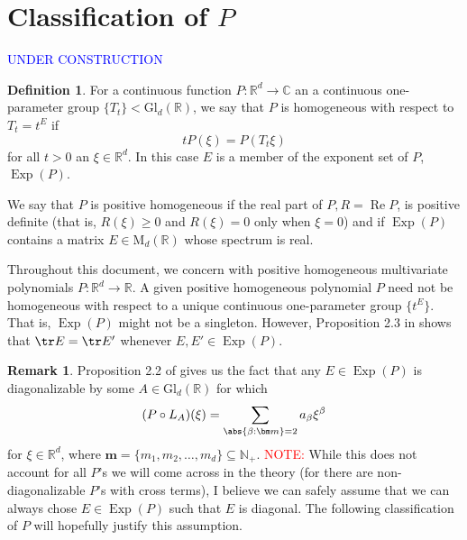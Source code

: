 \documentclass{article}
\theoremstyle{definition}
\renewcommand\Re{\operatorname{Re}}%
\newcommand\MdR{\mbox{M}_d(\mathbb{R})}
\newcommand\GldR{\mbox{Gl}_d(\mathbb{R})}
\newcommand\Exp{\operatorname{Exp}}
\newcommand*{\TakeFourierOrnament}[1]{{%
\fontencoding{U}\fontfamily{futs}\selectfont\char#1}}
\newcommand*{\danger}{\TakeFourierOrnament{66}}
\newcommand{\R}{\mathbb{R}}
\newcommand{\C}{\mathbb{C}}
\theoremstyle{theorem}
\newtheorem{definition}[theorem]{Definition}
\newtheorem{remark}{Remark}
\begin{document}
\newpage





\section{Classification of $P$}


\begin{framed}

\textcolor{blue}{\danger UNDER CONSTRUCTION \danger} 

\begin{definition}
For a continuous function $P: \R^d \to \C$ an a continuous one-parameter group $\{ T_t \} < \GldR{}$, we say that $P$ is homogeneous with respect to $T_t = t^E$ if 
\begin{equation*}
    tP(\xi) = P(T_t \xi)
\end{equation*}
for all $t>0$ an $\xi\in \R^d$. In this case $E$ is a member of the exponent set of $P$, $\Exp{(P)}$. 

We say that $P$ is positive homogeneous if the real part of $P, R =\Re{P}$, is positive definite (that is, $R(\xi) \geq 0$ and $R(\xi) = 0$ only when $\xi = 0$) and if $\Exp{(P)}$ contains a matrix $E\in \MdR{}$ whose spectrum is real. 
\end{definition}

Throughout this document, we concern with positive homogeneous multivariate polynomials $P : \R^d \to \R$. A given positive homogeneous polynomial $P$ need not be homogeneous with respect to a unique continuous one-parameter group $\{t^E\}$. That is, $\Exp(P)$ might not be a singleton. However, Proposition 2.3 in \cite{Randles2017} shows that $\tr E = \tr E'$ whenever $E,E'\in \Exp(P)$.



\begin{remark}
Proposition 2.2 of \cite{Randles2017} gives us the fact that any $E\in \Exp(P)$ is diagonalizable by some $A\in \GldR{}$ for which \begin{equation*}
    (P\circ L_A)(\xi) = \sum_{\abs{\beta : \bm m} = 2} a_\beta \xi^\beta
\end{equation*}
for $\xi\in \R^d$, where $\bm m = \{ m_1, m_2,\dots, m_d \}\subseteq \mathbb{N}_+$. \textcolor{red}{NOTE:} While this does not account for all $P$'s we will come across in the theory (for there are non-diagonalizable $P$'s with cross terms), I believe we can safely assume that we can always chose $E\in \Exp(P)$ such that $E$ is diagonal. The following classification of $P$ will hopefully justify this assumption.
\end{remark}




\end{framed}
\end{document}
